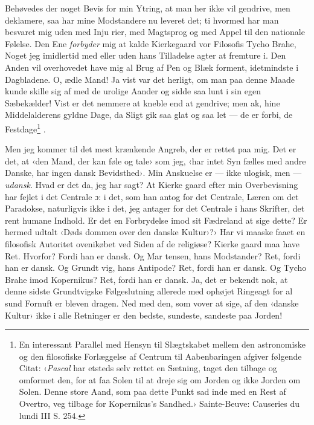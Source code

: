 \documentclass[12pt,a4paper,openany]{book}
\renewcommand{\thefootnote}{*)}
\newcommand{\fnmark}[2]{\renewcommand{\thefootnote}{#1}\footnote{#2}%
  \renewcommand{\thefootnote}{*)}}
\newcommand{\opage}[1]{\marginnote{\footnotesize\textit{[#1]}}}
\begin{document}
Behøvedes der noget Bevis for min Ytring, at man her ikke
vil gendrive, men deklamere, saa har mine Modstandere nu
leveret det; ti hvormed har man besvaret mig uden med Inju\-%
rier, med Magtsprog og med Appel til den nationale Følelse.
Den Ene \emph{forbyder} mig at kalde Kierkegaard vor Filosofis Tycho
Brahe, Noget jeg imidlertid med eller uden hans Tilladelse
agter at fremture i. Den Anden vil overhovedet have mig al
Brug af Pen og Blæk forment, idetmindste i Dagbladene. O,
ædle Mand! Ja vist var det herligt, om man paa denne Maade
kunde skille sig af med de urolige Aander og sidde saa lunt i
sin egen Sæbekælder! Vist er det nemmere at kneble end at
\opage{104}gendrive; men ak, hine Middelalderens gyldne Dage, da Sligt
gik saa glat og saa let --- de er forbi, de Festdage\fnmark{*)}{En
interessant Parallel med Hensyn til Slægtskabet mellem den
astronomiske og den filosofiske Forlæggelse af Centrum til Aabenbaringen
afgiver følgende Citat: ‹\emph{Pascal} har etsteds selv rettet en Sætning, taget
den tilbage og omformet den, for at faa Solen til at dreje sig om Jorden
og ikke Jorden om Solen. Denne store Aand, som paa dette Punkt sad
inde med en Rest af Overtro, veg tilbage for Kopernikus's Sandhed.›\endgraf
Sainte-Beuve: Causeries du lundi III S. 254.}.

Men jeg kommer til det mest krænkende Angreb, der er
rettet paa mig. Det er det, at ‹den Mand, der kan føle og
tale› som jeg, ‹har intet Syn fælles med andre Danske, har
ingen dansk Bevidsthed›. Min Anskuelse er --- ikke ulogisk,
men --- \emph{udansk}. Hvad er det da, jeg har sagt? At Kierke\-%
gaard efter min Overbevisning har fejlet i det Centrale ɔ: i det,
som han antog for det Centrale, Læren om det Paradokse,
naturligvis ikke i det, jeg antager for det Centrale i hans
Skrifter, det rent humane Indhold. Er det en Forbrydelse
imod sit Fædreland at sige dette? Er hermed udtalt ‹Døds\-%
dommen over den danske Kultur›?› Har vi maaske faaet en
filosofisk Autoritet ovenikøbet ved Siden af de religiøse? Kierke\-%
gaard maa have Ret. Hvorfor? Fordi han er dansk. Og Mar\-%
tensen, hans Modstander? Ret, fordi han er dansk. Og Grundt\-%
vig, hans Antipode? Ret, fordi han er dansk. Og Tycho Brahe
imod Kopernikus? Ret, fordi han er dansk. Ja, det er bekendt
nok, at denne sidste Grundtvigske Følgeslutning allerede med
ophøjet Ringeagt for al sund Fornuft er bleven dragen. Ned
med den, som vover at sige, af den ‹danske Kultur› ikke i
alle Retninger er den bedste, sundeste, sandeste paa Jorden!
\end{document}

